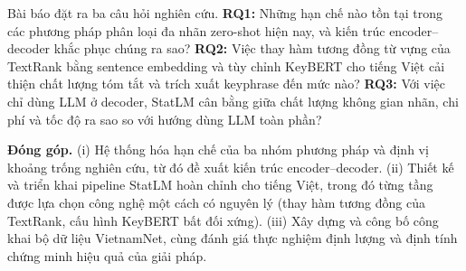Bài báo đặt ra ba câu hỏi nghiên cứu. \textbf{RQ1:} Những hạn chế nào tồn tại
trong các phương pháp phân loại đa nhãn zero-shot hiện nay, và kiến trúc
encoder--decoder khắc phục chúng ra sao? \textbf{RQ2:} Việc thay hàm tương đồng
từ vựng của TextRank bằng sentence embedding và tùy chỉnh KeyBERT cho tiếng Việt
cải thiện chất lượng tóm tắt và trích xuất keyphrase đến mức nào? \textbf{RQ3:}
Với việc chỉ dùng LLM ở decoder, StatLM cân bằng giữa chất lượng không gian nhãn,
chi phí và tốc độ ra sao so với hướng dùng LLM toàn phần?

\textbf{Đóng góp.} (i) Hệ thống hóa hạn chế của ba nhóm phương pháp và định vị
khoảng trống nghiên cứu, từ đó đề xuất kiến trúc encoder--decoder. (ii) Thiết kế
và triển khai pipeline StatLM hoàn chỉnh cho tiếng Việt, trong đó từng tầng được
lựa chọn công nghệ một cách có nguyên lý (thay hàm tương đồng của TextRank, cấu
hình KeyBERT bất đối xứng). (iii) Xây dựng và công bố công khai bộ dữ liệu
VietnamNet, cùng đánh giá thực nghiệm định lượng và định tính chứng minh hiệu quả
của giải pháp.

